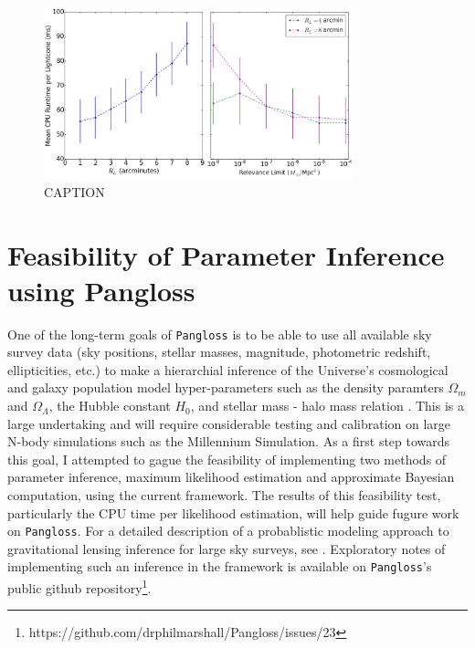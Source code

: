 \documentclass[%
 reprint,
 amsmath,amssymb,
 aps,nofootinbib
]{revtex4-1}
\begin{document}
\begin{figure}
    \centering
    \includegraphics[width=0.8\textwidth]{figs-swe/thesis/cpu_scaling.png}
    \captionsetup{justification=raggedright,singlelinecheck=false}
    \caption{CAPTION}
    \label{fig:cpu_scaling}
\end{figure}
%

\section{Feasibility of Parameter Inference using Pangloss} \label{feasibility}

One of the long-term goals of \texttt{Pangloss} is to be able to use all available sky survey data (sky positions, stellar masses, magnitude, photometric redshift, ellipticities, etc.) to make a hierarchial inference of the Universe's cosmological and galaxy population model hyper-parameters such as the density paramters $\Omega_m$ and $\Omega_\Lambda$, the Hubble constant $H_0$, and stellar mass - halo mass relation \cite{smhr}. This is a large undertaking and will require considerable testing and calibration on large N-body simulations such as the Millennium Simulation. As a first step towards this goal, I attempted to gague the feasibility of implementing two methods of parameter inference, maximum likelihood estimation and approximate Bayesian computation, using the current framework. The results of this feasibility test, particularly the CPU time per likelihood estimation, will help guide fugure work on \texttt{Pangloss}. For a detailed description of a probablistic modeling approach to gravitational lensing inference for large sky surveys, see \cite{grav_lens_inference}. Exploratory notes of implementing such an inference in the framework is available on \texttt{Pangloss}'s public github repository\footnote{https://github.com/drphilmarshall/Pangloss/issues/23}.\\
\end{document}
